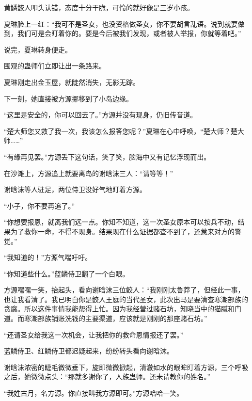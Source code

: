 \begin{this_body}
黄鳞鲛人叩头认错，态度十分干脆，可怜的就好像是三岁小孩。

夏琳脸上一红：“我可不是圣女，也没资格做圣女，你不要胡言乱语。说到就要做到，我们可是会盯着你的。要是今后被我们发现，或者被人举报，你就等着吧。”

说完，夏琳转身便走。

围观的蛊师们立即让出一条路来。

夏琳刚走出金玉屋，就陡然消失，无影无踪。

下一刻，她直接被方源挪移到了小岛边缘。

“这里是安全的，你可以回去了。”方源并没有现身，仍旧传音道。

“楚大师您又救了我一次，我该怎么报答您呢？”夏琳在心中呼唤，“楚大师？楚大师……”

“有缘再见罢。”方源丢下这句话，笑了笑，脑海中又有记忆浮现而出。

在沙滩上，方源追上就要离岛的谢晗沫三人：“请等等！”

谢晗沫等人驻足，两位侍卫没好气地盯着方源。

“小子，你不要再追了。”

“你想要报恩，就离我们远一点。你知不知道，这一次圣女原本可以按兵不动，结果为了救你一命，不得不现身。结果现在什么证据都查不到了，还惹来对方的警觉。”

“我知道的！”方源气喘吁吁。

“你知道些什么。”蓝鳞侍卫翻了一个白眼。

方源嘿嘿一笑，抬起头，看向谢晗沫三位鲛人：“我刚刚太鲁莽了，但经此一事，也让我看清了。我已明白你是鲛人王庭的当代圣女，此次出马是要清查寒潮部族的贪腐。所以这件事情我能帮得上忙。因为我经营过赌石坊，知晓当中的猫腻和门道。而寒潮部族销账洗钱的主要渠道，应该就是刚刚的那座赌石坊。”

“还请圣女给我这一次机会，让我把你的救命恩情报还了罢。”

蓝鳞侍卫、红鳞侍卫都迟疑起来，纷纷转头看向谢晗沫。

谢晗沫浓密的睫毛微微垂下，旋即微微掀起，清澈如水的眼眸盯着方源，三个呼吸之后，她微微点头：“那就多谢你了，人族蛊师。还未请教你的姓名。”

“我姓古月，名方源。你直接叫我方源即可。”方源哈哈一笑。

\end{this_body}

